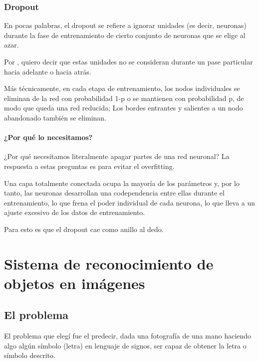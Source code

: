 \documentclass[12pt, fleqn]{report}                             %
\newcommand \Quote              {\qq}                           %
\theoremstyle{break}                                            %
\begin{document}
        \section{Dropout}
            En pocas palabras, el dropout se refiere a ignorar unidades (es decir, neuronas) durante la fase de 
            entrenamiento de cierto conjunto de neuronas que se elige al azar. 
            
            Por \Quote{ignorar}, quiero decir que estas unidades no se consideran durante un pase particular 
            hacia adelante o hacia atrás.

            Más técnicamente, en cada etapa de entrenamiento, los nodos individuales se eliminan 
            de la red con probabilidad 1-p o se mantienen con probabilidad p, 
            de modo que queda una red reducida; Los bordes entrantes y salientes a un 
            nodo abandonado también se eliminan.

            \subsection{¿Por qué lo necesitamos?}
                ¿Por qué necesitamos literalmente apagar partes de una red neuronal?
                La respuesta a estas preguntas es para evitar el overfitting.

                Una capa totalmente conectada ocupa la mayoría de los parámetros y, por lo 
                tanto, las neuronas desarrollan una codependencia entre 
                ellas durante el entrenamiento, lo que frena el poder individual de cada neurona, 
                lo que lleva a un ajuste excesivo de los datos de entrenamiento.

                Para esto es que el dropout cae como anillo al dedo.

\part{Sistema de reconocimiento de objetos en imágenes}

    \chapter{El problema}

        El problema que elegí fue el predecir, dada una fotografía de una mano haciendo algo algún símbolo (letra)
        en lenguaje de signos, ser capaz de obtener la letra o símbolo descrito.
        
\end{document}
